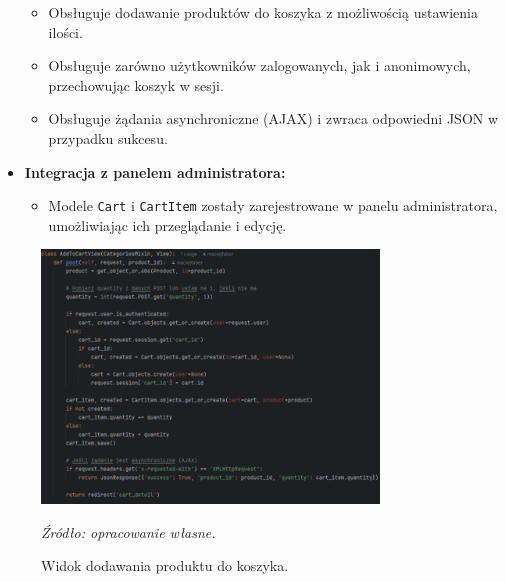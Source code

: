 \documentclass[12pt,a4paper,oneside]{article}
\theoremstyle{definition}
\numberwithin{equation}{section}
\begin{document}
\begin{itemize}
    \begin{itemize}
        \item Obsługuje dodawanie produktów do koszyka z możliwością ustawienia ilości.
        \item Obsługuje zarówno użytkowników zalogowanych, jak i anonimowych, przechowując koszyk w sesji.
        \item Obsługuje żądania asynchroniczne (AJAX) i zwraca odpowiedni JSON w przypadku sukcesu.
    \end{itemize}
    \item \textbf{Integracja z panelem administratora:}
    \begin{itemize}
        \item Modele \texttt{Cart} i \texttt{CartItem} zostały zarejestrowane w panelu administratora, umożliwiając ich przeglądanie i edycję.
    \end{itemize}
\end{itemize}
\begin{figure}[H]
    \centering
    \includegraphics[width=0.8\textwidth]{images/krzysztofBImages/add_to_cart_view.png}
    \caption{Widok dodawania produktu do koszyka.}
    \emph{Źródło: opracowanie własne.}
    \label{fig:add_to_cart}
\end{figure}
%
%
\end{document}
